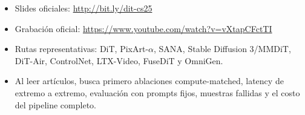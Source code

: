 \documentclass[a4paper]{article}
\begin{document}
\begin{itemize}[itemsep=0.2em,topsep=0.2em]
  \item Slides oficiales: \url{http://bit.ly/dit-cs25}
  \item Grabación oficial: \url{https://www.youtube.com/watch?v=vXtapCFctTI}
  \item Rutas representativas: DiT, PixArt-$\alpha$, SANA, Stable Diffusion 3/MMDiT, DiT-Air, ControlNet, LTX-Video, FuseDiT y OmniGen.
  \item Al leer artículos, busca primero ablaciones compute-matched, latency de extremo a extremo, evaluación con prompts fijos, muestras fallidas y el costo del pipeline completo.
\end{itemize}
\end{document}
